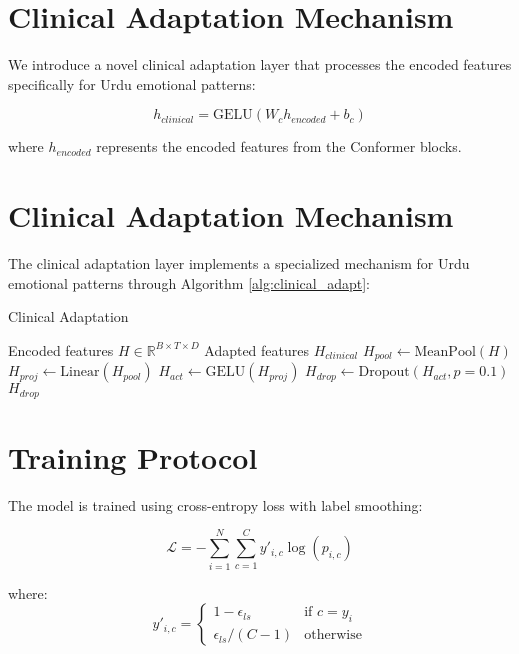 \documentclass[12pt,a4paper]{article}
\begin{document}
\section{Clinical Adaptation Mechanism}
We introduce a novel clinical adaptation layer that processes the encoded features specifically for Urdu emotional patterns:

\begin{equation}
    h_{clinical} = \text{GELU}(W_{c}h_{encoded} + b_c)
\end{equation}

where $h_{encoded}$ represents the encoded features from the Conformer blocks.

\section{Clinical Adaptation Mechanism}
The clinical adaptation layer implements a specialized mechanism for Urdu emotional patterns through Algorithm \ref{alg:clinical_adapt}:

\begin{algorithm}[H]
\caption{Clinical Adaptation}
\label{alg:clinical_adapt}
\begin{algorithmic}[1]
\Require Encoded features $H \in \mathbb{R}^{B \times T \times D}$
\Ensure Adapted features $H_{clinical}$
\State $H_{pool} \gets \text{MeanPool}(H)$ 
\State $H_{proj} \gets \text{Linear}(H_{pool})$ 
\State $H_{act} \gets \text{GELU}(H_{proj})$ 
\State $H_{drop} \gets \text{Dropout}(H_{act}, p=0.1)$ 
\State \Return $H_{drop}$
\end{algorithmic}
\end{algorithm}

\section{Training Protocol}
The model is trained using cross-entropy loss with label smoothing:

\begin{equation}
    \mathcal{L} = -\sum_{i=1}^{N}\sum_{c=1}^{C} y'_{i,c}\log(p_{i,c})
\end{equation}

where:
\begin{equation}
    y'_{i,c} = \begin{cases}
        1 - \epsilon_{ls} & \text{if } c = y_i \\
        \epsilon_{ls}/(C-1) & \text{otherwise}
    \end{cases}
\end{equation}
\end{document}

